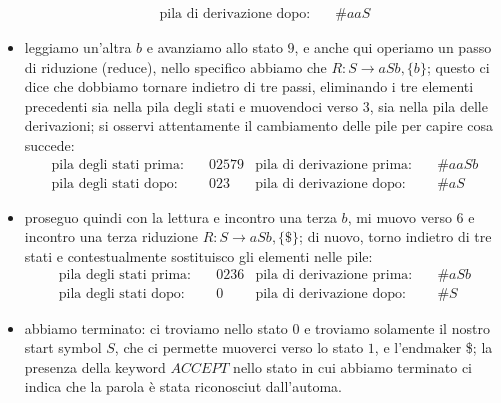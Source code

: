 \documentclass[class=book, crop=false, oneside, 12pt]{standalone}
\begin{document}
\begin{itemize}
\begin{align*}
        \textrm{pila di derivazione dopo:} &\quad \#aaS 
    \end{align*}
    \item leggiamo un'altra \(b\) e avanziamo allo stato \(9\), e anche qui operiamo un passo di riduzione (reduce), nello specifico abbiamo che \(R: S \to aSb, \{b\}\); questo ci dice che dobbiamo tornare indietro di tre passi, eliminando i tre elementi precedenti sia nella pila degli stati e muovendoci verso \(3\), sia nella pila delle derivazioni; si osservi attentamente il cambiamento delle pile per capire cosa succede:
    \begin{align*}
        \textrm{pila degli stati prima:} &\quad 02579 & \textrm{pila di derivazione prima:} &\quad \#aaSb \\
        \textrm{pila degli stati dopo:} &\quad 023 & \textrm{pila di derivazione dopo:} &\quad \#aS
    \end{align*}
    \item proseguo quindi con la lettura e incontro una terza \(b\), mi muovo verso \(6\) e incontro una terza riduzione \(R: S \to aSb, \{\$\}\); di nuovo, torno indietro di tre stati e contestualmente sostituisco gli elementi nelle pile: 
    \begin{align*}
        \textrm{pila degli stati prima:} &\quad 0236 & \textrm{pila di derivazione prima:} &\quad \#aSb \\
        \textrm{pila degli stati dopo:} &\quad 0 & \textrm{pila di derivazione dopo:} &\quad \#S
    \end{align*}
    \item abbiamo terminato: ci troviamo nello stato \(0\) e troviamo solamente il nostro start symbol \(S\), che ci permette  muoverci verso lo stato \(1\), e l'endmaker \$; la presenza della keyword \(ACCEPT\) nello stato in cui abbiamo terminato ci indica che la parola è stata riconosciut dall'automa.
\end{itemize}
\end{document}
